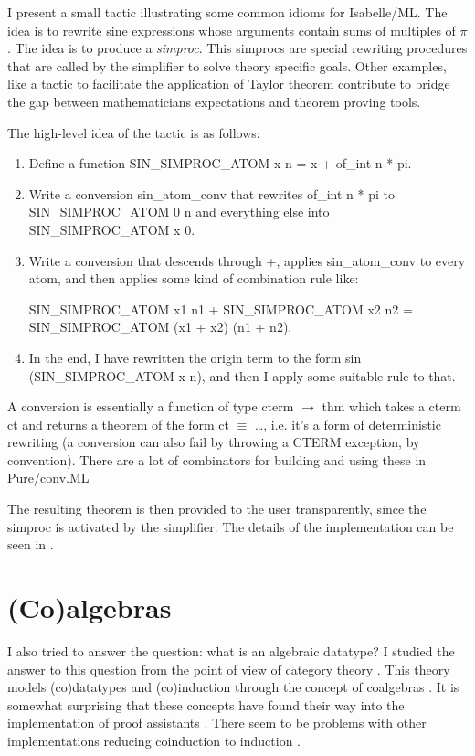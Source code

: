 \documentclass[notitlepage]{article}
\begin{document}
I present a small tactic illustrating some common idioms for Isabelle/ML. The idea is to rewrite sine expressions whose arguments contain sums of multiples of $\pi$. The idea is to produce a \textit{simproc}. This simprocs are special rewriting procedures that are called by the simplifier to solve theory specific goals. Other examples, like a tactic to facilitate the application of Taylor theorem contribute to bridge the gap between mathematicians expectations and theorem proving tools. 

The high-level idea of the tactic \cite{sines} is as follows:

\begin{enumerate}
\item Define a function SIN\_SIMPROC\_ATOM x n = x + of\_int n * pi.
\item Write a conversion sin\_atom\_conv that rewrites of\_int n * pi to SIN\_SIMPROC\_ATOM 0 n and everything else into SIN\_SIMPROC\_ATOM x 0. 
\item Write a conversion that descends through +, applies sin\_atom\_conv to every atom, and then applies some kind of combination rule like:

 SIN\_SIMPROC\_ATOM x1 n1 + SIN\_SIMPROC\_ATOM x2 n2 = \\
 SIN\_SIMPROC\_ATOM (x1 + x2) (n1 + n2).
\item In the end, I have rewritten the origin term to the form sin (SIN\_SIMPROC\_ATOM x n), and then I apply some suitable rule to that.
\end{enumerate}

A conversion is essentially a function of type cterm $\to$ thm which takes a cterm ct and returns a theorem of the form ct $\equiv$ …, i.e. it's a form of deterministic rewriting (a conversion can also fail by throwing a CTERM exception, by convention). There are a lot of combinators for building and using these in Pure/conv.ML

The resulting theorem is then provided to the user transparently, since the simproc is activated by the simplifier. The details of the implementation can be seen in \cite{sineimplementation}.

\section{(Co)algebras}

I also tried to answer the question: what is an algebraic datatype? I studied the answer to this question from the point of view of category theory \cite{barr1990category}. This theory models (co)datatypes and (co)induction through the concept of coalgebras \cite{smyth1982category} \cite{denecke2009universal} \cite{rutten}. It is somewhat surprising that these concepts have found their way into the implementation of proof assistants \cite{traytel} \cite{blanchette2014cardinals}. There seem to be problems with other implementations reducing coinduction to induction \cite{blanchette2015foundational} \cite{coq1} \cite{coq2} \cite{coq3}. 
\end{document}
